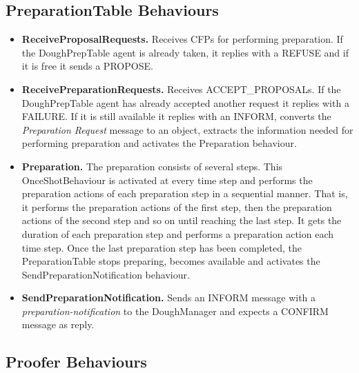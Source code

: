 \documentclass[paper=a4, fontsize=11pt]{scrartcl}
\begin{document}
		\subsection*{PreparationTable Behaviours}

		\begin{itemize}
			\item \textbf{ReceiveProposalRequests.} Receives CFPs for performing preparation. If the DoughPrepTable agent is already taken, it replies with a REFUSE and if it is free it sends a PROPOSE.

			\item \textbf{ReceivePreparationRequests.} Receives ACCEPT\_PROPOSALs.  If the DoughPrepTable agent has already accepted another request it replies with a FAILURE. If it is still available it replies with an INFORM, converts the \textit{Preparation Request} message to an object, extracts the information needed for performing preparation and activates the Preparation behaviour.

			\item \textbf{Preparation.} The preparation consists of several steps. This OnceShotBehaviour is activated at every time step and performs the preparation actions of each preparation step in a sequential manner. That is, it performs the preparation actions of the first step, then the preparation actions of the second step and so on until reaching the last step. It gets the duration of each preparation step and performs a preparation action each time step. Once the last preparation step has been completed, the PreparationTable stops preparing, becomes available and activates the SendPreparationNotification behaviour.

			\item \textbf{SendPreparationNotification.} Sends an INFORM message with a \textit{preparation-notification} to the DoughManager and expects a CONFIRM message as reply.
		\end{itemize}

		\subsection*{Proofer Behaviours}
\end{document}
